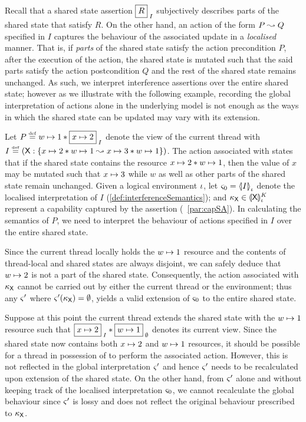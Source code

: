 Recall that a shared state assertion $\shared{R}{I}$ subjectively describes parts of the shared state that satisfy $R$. On the other hand, an action of the form $P \swap Q$ specified in $I$ captures the behaviour of the associated update in a \emph{localised} manner. That is, if \emph{parts} of the shared state satisfy the action precondition $P$, after the execution of the action, the shared state is mutated such that the said parts satisfy the action postcondition $Q$ and the rest of the shared state remains unchanged. As such, we interpret interference assertions over the entire shared state; however as we illustrate with the following example, recording the global interpretation of actions alone in the underlying model is not enough as the ways in which the shared state can be updated may vary with its extension. 
\begin{example}[]Let $P \eqdef \cell{w}{1} * \shared{\cell{x}{2}}{I}$ denote the view of the current thread with $I \eqdef \left(\token{X}: \left\{\cell{x}{2} * \cell{w}{1} \swap \cell{x}{3} * \cell{w}{1}\right\}\right)$. The action associated with  states that if the shared state contains the resource $\cell{x}{2} * \cell{w}{1}$, then the value of $x$ may be mutated such that $\cell{x}{3}$ while $w$ as well as other parts of the shared state remain unchanged. Given a logical environment $\lenv$, let $\amod{0} = \semI[\lenv]{I}$ denote the localised interpretation of $I$ (\ref{def:interferenceSemantics}); and $\ca{\textsf{X}} \in  \semK[\lenv]{\token{X}}$ represent a capability captured by the assertion  (\param~\ref{par:capSA}). In calculating the semantics of $P$, we need to interpret the behaviour of actions specified in $I$ over the entire shared state.

Since the current thread locally holds the $\cell{w}{1}$ resource and the contents of thread-local and shared states are always disjoint, we can safely deduce that $\cell{w}{2}$ is not a part of the shared state. Consequently, the action associated with $\ca{\textsf{X}}$ cannot be carried out by either the current thread or the environment; thus any $\amod{}'$ where $\amod{}'(\ca{\textsf{X}}) = \emptyset$, yields a valid extension of $\amod{0}$ to the entire shared state.

Suppose at this point the current thread extends the shared state with the $\cell{w}{1}$ resource such that $\shared{\cell{x}{2}}{I} * \shared{\cell{w}{1}}{\emptyset}$ denotes its current view. Since the shared state now contains both $\cell{x}{2}$ and $\cell{w}{1}$ resources, it should be possible for a thread in possession of  to perform the associated action. However, this is not reflected in the global interpretation $\amod{}'$ and hence $\amod{}'$ needs to be recalculated upon extension of the shared state. On the other hand, from $\amod{}'$ alone and without keeping track of the localised interpretation $\amod{0}$, we cannot recalculate the global behaviour since $\amod{}'$ is lossy and does not reflect the original behaviour prescribed to $\ca{\textsf{X}}$.
\end{example}
